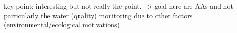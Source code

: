 








key point: interesting but not really the point. --> goal here are AAs and not particularly the water (quality) monitoring due to other factors (environmental/ecological motivations)

